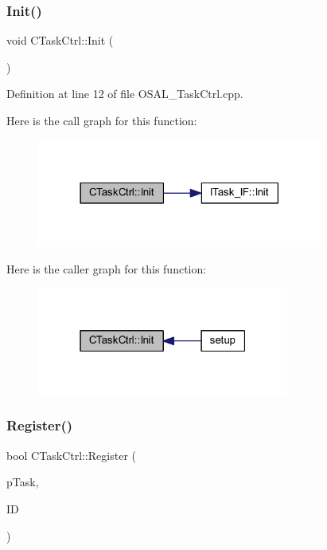 \subsubsection{\texorpdfstring{Init()}{Init()}}
{\footnotesize\ttfamily void C\+Task\+Ctrl\+::\+Init (\begin{DoxyParamCaption}\item[{void}]{ }\end{DoxyParamCaption})}



Definition at line 12 of file O\+S\+A\+L\+\_\+\+Task\+Ctrl.\+cpp.

Here is the call graph for this function\+:\nopagebreak
\begin{figure}[H]
\begin{center}
\leavevmode
\includegraphics[width=266pt]{class_c_task_ctrl_a12ec6e8d4a490eba9ebdf22d32cf292b_cgraph}
\end{center}
\end{figure}
Here is the caller graph for this function\+:\nopagebreak
\begin{figure}[H]
\begin{center}
\leavevmode
\includegraphics[width=235pt]{class_c_task_ctrl_a12ec6e8d4a490eba9ebdf22d32cf292b_icgraph}
\end{center}
\end{figure}
\mbox{\label{class_c_task_ctrl_a20457bd4d4a033c8aeeb44e9d4dc3c7c}} 
\subsubsection{\texorpdfstring{Register()}{Register()}}
{\footnotesize\ttfamily bool C\+Task\+Ctrl\+::\+Register (\begin{DoxyParamCaption}\item[{\mbox{\hyperlink{class_i_task___i_f}{I\+Task\+\_\+\+IF}} $\ast$}]{p\+Task,  }\item[{\mbox{\hyperlink{_a_d_a_s___types_8h_aba7bc1797add20fe3efdf37ced1182c5}{uint8\+\_\+t}}}]{ID }\end{DoxyParamCaption})}



